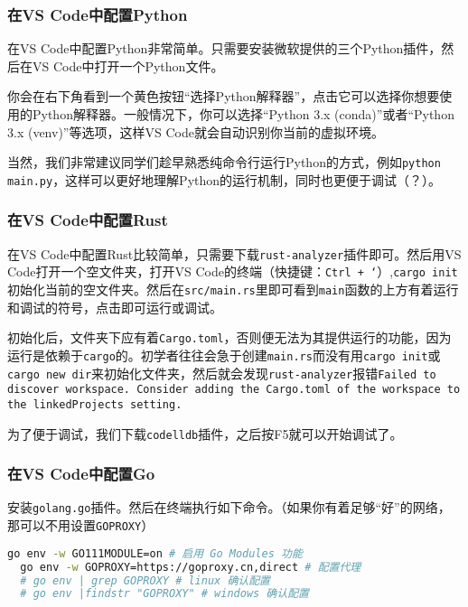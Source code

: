 \documentclass[../main.tex]{subfiles}
\begin{document}
\subsubsection{在VS Code中配置Python}

在VS Code中配置Python非常简单。只需要安装微软提供的三个Python插件，然后在VS Code中打开一个Python文件。

你会在右下角看到一个黄色按钮“选择Python解释器”，点击它可以选择你想要使用的Python解释器。一般情况下，你可以选择“Python 3.x (conda)”或者“Python 3.x (venv)”等选项，这样VS Code就会自动识别你当前的虚拟环境。

当然，我们非常建议同学们趁早熟悉纯命令行运行Python的方式，例如\texttt{python main.py}，这样可以更好地理解Python的运行机制，同时也更便于调试（？）。

\subsubsection{在VS Code中配置Rust}

在VS Code中配置Rust比较简单，只需要下载\texttt{rust-analyzer}插件即可。然后用VS Code打开一个空文件夹，打开VS Code的终端（快捷键：\texttt{Ctrl + `}）,\texttt{cargo init} 初始化当前的空文件夹。然后在\texttt{src/main.rs}里即可看到\texttt{main}函数的上方有着运行和调试的符号，点击即可运行或调试。

\begin{caution}
  初始化后，文件夹下应有着\texttt{Cargo.toml}，否则便无法为其提供运行的功能，因为运行是依赖于\texttt{cargo}的。初学者往往会急于创建\texttt{main.rs}而没有用\texttt{cargo init}或\texttt{cargo new dir}来初始化文件夹，然后就会发现\texttt{rust-analyzer}报错\texttt{Failed to discover workspace. Consider adding the Cargo.toml of the workspace to the linkedProjects setting.}
\end{caution}

为了便于调试，我们下载\texttt{codelldb}插件，之后按F5就可以开始调试了。

\subsubsection{在VS Code中配置Go}

安装\texttt{golang.go}插件。然后在终端执行如下命令。（如果你有着足够“好”的网络，那可以不用设置\texttt{GOPROXY}）

\begin{lstlisting}[language=bash]
  go env -w GO111MODULE=on # 启用 Go Modules 功能
  go env -w GOPROXY=https://goproxy.cn,direct # 配置代理
  # go env | grep GOPROXY # linux 确认配置
  # go env |findstr "GOPROXY" # windows 确认配置
\end{lstlisting}
\end{document}
